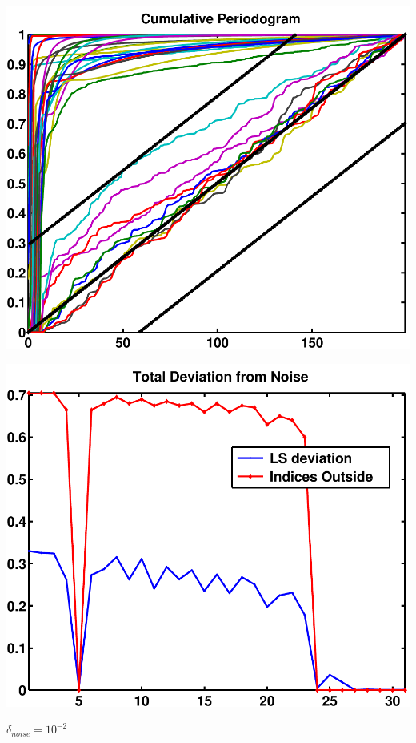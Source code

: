 \documentclass[11pt]{amsart}
\begin{document}
	\vspace{5mm}
	\begin{minipage}[t]{0.5\textwidth}
	
		\includegraphics[width=.95\linewidth]{figures/run4/cum_per} 
   
	\end{minipage}
	\begin{minipage}[t]{0.5\textwidth}
	
		\includegraphics[width=.95\linewidth]{figures/run4/total_deviation} 
   
	\end{minipage}
		\vspace{5mm}
		{\centering $\delta_{noise}=10^{-2}$}
	
\end{document}

